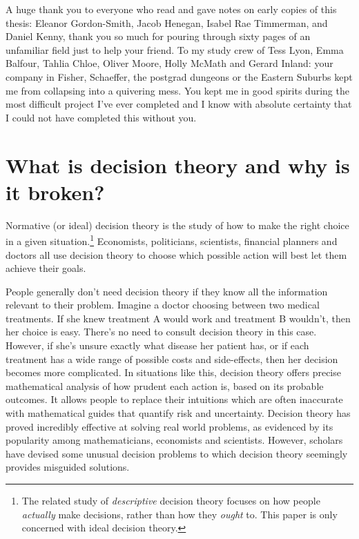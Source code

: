 \documentclass{article}
\begin{document}
A huge thank you to everyone who read and gave notes on early copies of this thesis: Eleanor Gordon-Smith, Jacob Henegan, Isabel Rae Timmerman, and Daniel Kenny, thank you so much for pouring through sixty pages of an unfamiliar field just to help your friend. To my study crew of Tess Lyon, Emma Balfour, Tahlia Chloe, Oliver Moore, Holly McMath and Gerard Inland: your company in Fisher, Schaeffer, the postgrad dungeons or the Eastern Suburbs kept me from collapsing into a quivering mess. You kept me in good spirits during the most difficult project I've ever completed and I know with absolute certainty that I could not have completed this without you.

\newpage\tableofcontents

\newpage\section{What is decision theory and why is it broken?}

Normative (or ideal) decision theory is the study of how to make the right choice in a given situation.\footnote{The related study of \textit{descriptive} decision theory focuses on how people \textit{actually} make decisions, rather than how they \textit{ought} to. This paper is only concerned with ideal decision theory.} Economists, politicians, scientists, financial planners and doctors all use decision theory to choose which possible action will best let them achieve their goals.

People generally don't need decision theory if they know all the information relevant to their problem. Imagine a doctor choosing between two medical treatments. If she knew treatment A would work and treatment B wouldn't, then her choice is easy. There's no need to consult decision theory in this case. However, if she's unsure exactly what disease her patient has, or if each treatment has a wide range of possible costs and side-effects, then her decision becomes more complicated. In situations like this, decision theory offers precise mathematical analysis of how prudent each action is, based on its probable outcomes. It allows people to replace their intuitions \textemdash{} which are often inaccurate \textemdash{} with mathematical guides that quantify risk and uncertainty. Decision theory has proved incredibly effective at solving real world problems, as evidenced by its popularity among mathematicians, economists and scientists. However, scholars have devised some unusual decision problems to which decision theory seemingly provides misguided solutions. 
\end{document}

